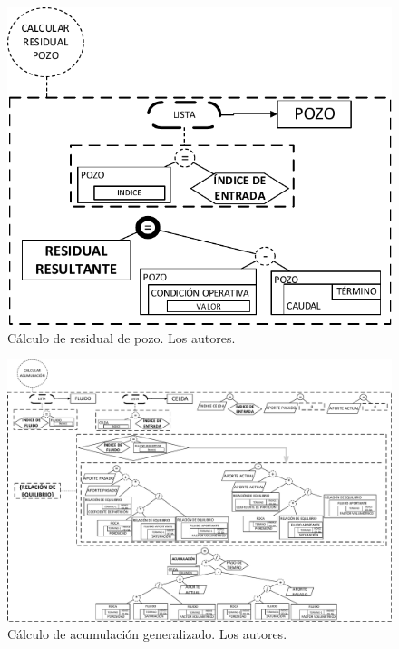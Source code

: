 \begin{figure}[h]
	\centering%
	\includegraphics[width=0.9\linewidth]{Fig/CalcularResidualPozo.pdf}%
	\caption[Cálculo de residual de pozo.]{Cálculo de residual de pozo. Los autores.} \label{fig:ResidualWell}
\end{figure}
\begin{figure}[h]
	\centering%
	\includegraphics[width=0.9\linewidth]{Fig/CalcularAcumulacion.pdf}%
	\caption[Cálculo de acumulación generalizado.]{Cálculo de acumulación generalizado. Los autores.} \label{fig:Accumulation}
\end{figure}
